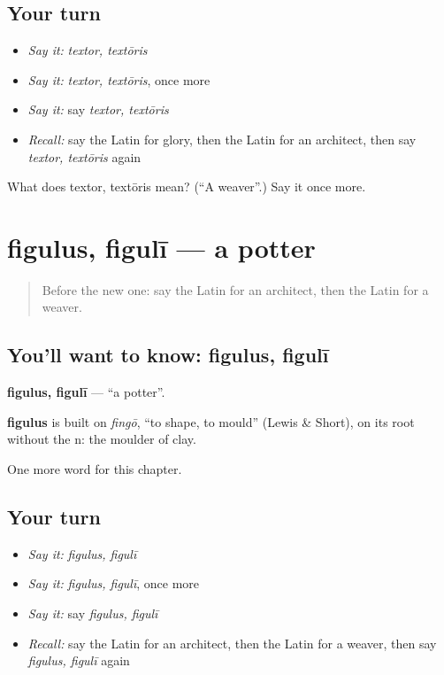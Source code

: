 \subsection*{Your turn}
\begin{itemize}
\raggedright
  \item \emph{Say it:} \emph{textor, textōris}
  \item \emph{Say it:} \emph{textor, textōris}, once more
  \item \emph{Say it:} say \emph{textor, textōris}
  \item \emph{Recall:} say the Latin for glory, then the Latin for an architect, then say \emph{textor, textōris} again
\end{itemize}

\begin{tcolorbox}[breakable,colback=teal!4,colframe=teal!35!black,title={Before you move on}]
What does textor, textōris mean? (\textquotedblleft{}A weaver\textquotedblright{}.) Say it once more.
\end{tcolorbox}
\section[figulus, figulī]{figulus, figulī — a potter}

\label{lesson:LA-C188-figulus}



\begin{quote}
Before the new one: say the Latin for an architect, then the Latin for a weaver.
\end{quote}

\subsection*{You'll want to know: figulus, figulī}
\textbf{figulus, figulī} — \textquotedblleft{}a potter\textquotedblright{}.

\begin{cousinweb}
\textbf{figulus} is built on \emph{fingō}, \textquotedblleft{}to shape, to mould\textquotedblright{} (Lewis \& Short), on its root without the n: the moulder of clay.
\end{cousinweb}

\begin{grammarlens}[title={What you've built}]
One more word for this chapter.
\end{grammarlens}

\subsection*{Your turn}
\begin{itemize}
\raggedright
  \item \emph{Say it:} \emph{figulus, figulī}
  \item \emph{Say it:} \emph{figulus, figulī}, once more
  \item \emph{Say it:} say \emph{figulus, figulī}
  \item \emph{Recall:} say the Latin for an architect, then the Latin for a weaver, then say \emph{figulus, figulī} again
\end{itemize}

